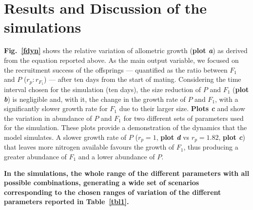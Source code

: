 \documentclass[a4paper,oneside]{article}
\begin{document}
  \section*{Results and Discussion of the simulations}
    \textbf{Fig.~\ref{fdyn}} shows the relative variation of allometric growth (\textbf{plot {\color{blue}\textit{a}}}) as derived from the equation reported above.
    As the main output variable, we focused on the recruitment success of the offsprings --- quantified as the ratio between $F_{1}$ and $P$ ($r_p : r_{F_{1}}$) --- after ten days from the start of mating.
    Considering the time interval chosen for the simulation (ten days), the size reduction of $P$ and $F_{1}$ (\textbf{plot {\color{blue}\textit{b}}}) is negligible and, with it, the change in the growth rate of $P$ and $F_{1}$, with a significantly slower growth rate for $F_{1}$ due to their larger size.
    \textbf{Plots {\color{blue}\textit{c}}} and {\textbf{}} show the variation in abundance of $P$ and $F_{1}$ for two different sets of parameters used for the simulation.
    These plots provide a demonstration of the dynamics that the model simulates.
    A slower growth rate of $P$ ($r_p=1$, \textbf{plot {\color{blue}\textit{d}}} vs $r_p=1.82$, \textbf{plot {\color{blue}\textit{c}}}) that leaves more nitrogen available favours the growth of $F_{1}$, thus producing a greater abundance of $F_{1}$ and a lower abundance of $P$.
    
    \textbf{\color{brown}
      In the simulations, the whole range of the different parameters with all possible combinations, generating a wide set of scenarios corresponding to the chosen ranges of variation of the different parameters reported in \textbf{Table}~\ref{tbl1}.
    }
\end{document}

